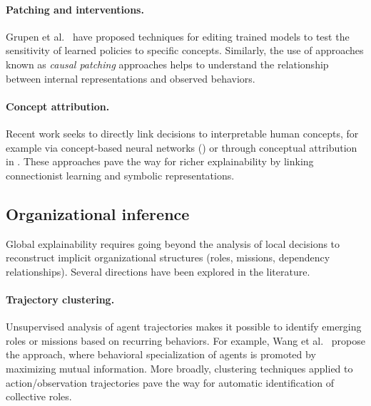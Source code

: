         \paragraph{Patching and interventions.}
        Grupen et al.~\cite{grupen2022concept} have proposed techniques
        for editing trained models to test the sensitivity
        of learned policies to specific concepts.
        Similarly, the use of approaches known as \textit{causal patching}
        \cite{geiger2021causal} approaches helps to understand the relationship between
        internal representations and observed behaviors.

        \paragraph{Concept attribution.}
        Recent work seeks to directly link decisions
        to interpretable human concepts,
        for example via concept-based neural networks ()
        \cite{kim2018interpretability}
        or through conceptual attribution in 
        \cite{zabounidis2023concept}.
        These approaches pave the way for richer explainability
        by linking connectionist learning and symbolic representations.

        \subsection{Organizational inference}

        \noindent
        Global explainability requires going beyond the analysis of local decisions
        to reconstruct implicit organizational structures
        (roles, missions, dependency relationships).
        Several directions have been explored in the literature.

        \paragraph {Trajectory clustering.}
        Unsupervised analysis of agent trajectories makes it possible to identify
        emerging roles or missions based on recurring behaviors.
        For example, Wang et al.~\cite{Wang2020} propose the  approach, where behavioral specialization
        of agents is promoted by maximizing mutual information.
        More broadly, clustering techniques applied to
        action/observation trajectories pave the way for automatic identification
        of collective roles.

